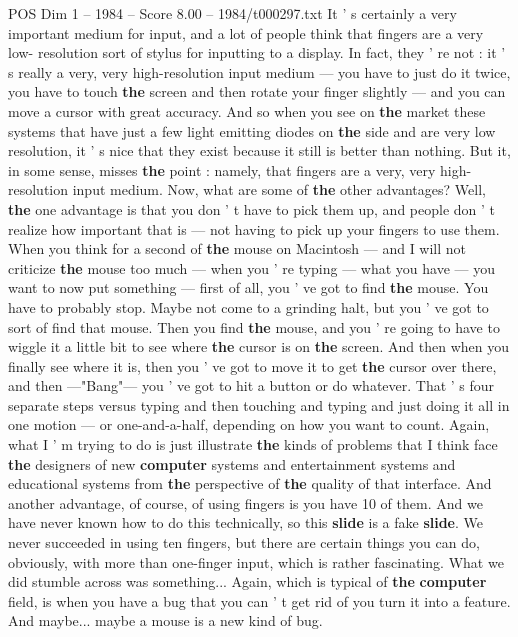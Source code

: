 \begin{textsample}{POS Dim 1 – 1984 – Score 8.00 – 1984/t000297.txt}
It ' s certainly a very important medium for input, and a lot of people think that fingers are a very low- resolution sort of stylus for inputting to a display.
In fact, they ' re not : it ' s really a very, very high-resolution input medium — you have to just do it twice, you have to touch \textbf{the} screen and then rotate your finger slightly — and you can move a cursor with great accuracy.
And so when you see on \textbf{the} market these systems that have just a few light emitting diodes on \textbf{the} side and are very low resolution, it ' s nice that they exist because it still is better than nothing.
But it, in some sense, misses \textbf{the} point : namely, that fingers are a very, very high-resolution input medium.
Now, what are some of \textbf{the} other advantages?
Well, \textbf{the} one advantage is that you don ' t have to pick them up, and people don ' t realize how important that is — not having to pick up your fingers to use them.
When you think for a second of \textbf{the} mouse on Macintosh — and I will not criticize \textbf{the} mouse too much — when you ' re typing — what you have — you want to now put something — first of all, you ' ve got to find \textbf{the} mouse.
You have to probably stop.
Maybe not come to a grinding halt, but you ' ve got to sort of find that mouse.
Then you find \textbf{the} mouse, and you ' re going to have to wiggle it a little bit to see where \textbf{the} cursor is on \textbf{the} screen.
And then when you finally see where it is, then you ' ve got to move it to get \textbf{the} cursor over there, and then —"Bang"— you ' ve got to hit a button or do whatever.
That ' s four separate steps versus typing and then touching and typing and just doing it all in one motion — or one-and-a-half, depending on how you want to count.
Again, what I ' m trying to do is just illustrate \textbf{the} kinds of problems that I think face \textbf{the} designers of new \textbf{computer} systems and entertainment systems and educational systems from \textbf{the} perspective of \textbf{the} quality of that interface.
And another advantage, of course, of using fingers is you have 10 of them.
And we have never known how to do this technically, so this \textbf{slide} is a fake \textbf{slide}.
We never succeeded in using ten fingers, but there are certain things you can do, obviously, with more than one-finger input, which is rather fascinating.
What we did stumble across was something...
Again, which is typical of \textbf{the} \textbf{computer} field, is when you have a bug that you can ' t get rid of you turn it into a feature.
And maybe... maybe a mouse is a new kind of bug.

\end{textsample}

